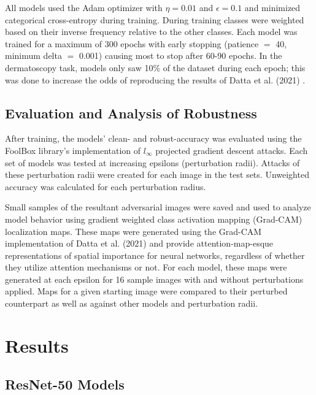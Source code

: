 \documentclass[10pt,twocolumn,letterpaper]{article}
\begin{document}
      All models used the Adam optimizer with $\eta=0.01$ and $\epsilon=0.1$ and minimized categorical cross-entropy during training. During training classes were weighted based on their inverse frequency relative to the other classes. Each model was trained for a maximum of 300 epochs with early stopping (patience $=$ 40, minimum delta $=$ 0.001) causing most to stop after 60-90 epochs. In the dermatoscopy task, models only saw 10\% of the dataset during each epoch; this was done to increase the odds of reproducing the results of Datta et al. (2021) \cite{AttentionSkinCancerClassification}.

    \subsection{Evaluation and Analysis of Robustness}
      After training, the models' clean- and robust-accuracy was evaluated using the FoolBox \cite{FoolBoxPaper}\cite{FoolBoxLibrary} library's implementation of $l_\infty$ projected gradient descent attacks. Each set of models was tested at increasing epsilons (perturbation radii). Attacks of these perturbation radii were created for each image in the test sets. Unweighted accuracy was calculated for each perturbation radius.

      

      Small samples of the resultant adversarial images were saved and used to analyze model behavior using gradient weighted class activation mapping (Grad-CAM) \cite{Grad-CAM} localization maps. These maps were generated using the Grad-CAM implementation of Datta et al. (2021) \cite{AttentionSkinCancerClassification} and provide attention-map-esque representations of spatial importance for neural networks, regardless of whether they utilize attention mechanisms or not. For each model, these maps were generated at each epsilon for 16 sample images with and without perturbations applied. Maps for a given starting image were compared to their perturbed counterpart as well as against other models and perturbation radii.

  \section{Results}
    \subsection{ResNet-50 Models}
      
      
      
\end{document}
